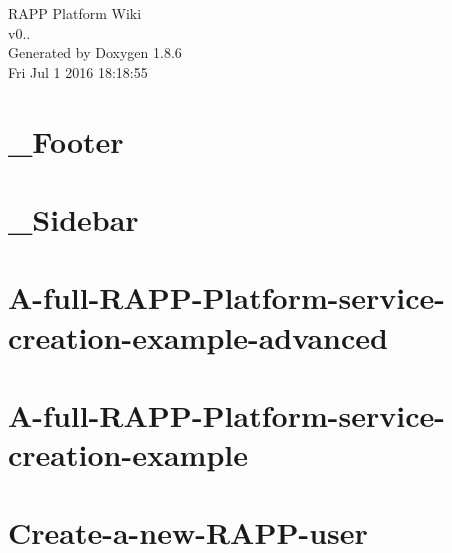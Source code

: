 \documentclass[twoside]{book}
\newcommand{\clearemptydoublepage}{%
  \newpage{\pagestyle{empty}\cleardoublepage}%
}
\begin{document}
\hypersetup{pageanchor=false}
\begin{titlepage}
\vspace*{7cm}
\begin{center}%
{\Large R\-A\-P\-P Platform Wiki \\[1ex]\large v0.. }\\
\vspace*{1cm}
{\large Generated by Doxygen 1.8.6}\\
\vspace*{0.5cm}
{\small Fri Jul 1 2016 18:18:55}\\
\end{center}
\end{titlepage}
\clearemptydoublepage
\tableofcontents
\clearemptydoublepage
{}
\hypersetup{pageanchor=true}

\chapter{\-\_\-\-Footer}
\label{md_rapp-platform_8wiki__Footer}
\hypertarget{md_rapp-platform_8wiki__Footer}{}

\chapter{\-\_\-\-Sidebar}
\label{md_rapp-platform_8wiki__Sidebar}
\hypertarget{md_rapp-platform_8wiki__Sidebar}{}

\chapter{A-\/full-\/\-R\-A\-P\-P-\/\-Platform-\/service-\/creation-\/example-\/advanced}
\label{md_rapp-platform_8wiki_A-full-RAPP-Platform-service-creation-example-advanced}
\hypertarget{md_rapp-platform_8wiki_A-full-RAPP-Platform-service-creation-example-advanced}{}

\chapter{A-\/full-\/\-R\-A\-P\-P-\/\-Platform-\/service-\/creation-\/example}
\label{md_rapp-platform_8wiki_A-full-RAPP-Platform-service-creation-example}
\hypertarget{md_rapp-platform_8wiki_A-full-RAPP-Platform-service-creation-example}{}

\chapter{Create-\/a-\/new-\/\-R\-A\-P\-P-\/user}
\label{md_rapp-platform_8wiki_Create-a-new-RAPP-user}
\hypertarget{md_rapp-platform_8wiki_Create-a-new-RAPP-user}{}

\end{document}

